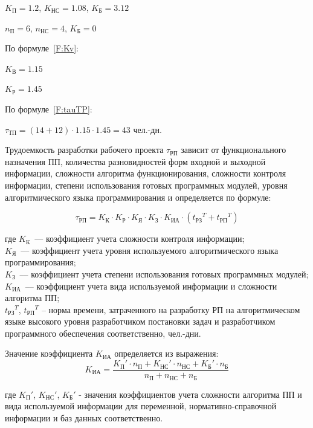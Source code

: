 $K_{\text{П}} = 1.2$, $K_{\text{НС}} = 1.08$, $K_{\text{Б}} = 3.12$

$n_{\text{П}} = 6$, $n_{\text{НС}} = 4$, $K_{\text{Б}} = 0$

По формуле~\ref{F:Kv}:

$K_{\text{В}} = 1.15$

$K_{\text{Р}} = 1.45$

По формуле~\ref{F:tauTP}:

$\tau_{\text{ТП}} = (14 + 12) \cdot 1.15 \cdot 1.45 = 43$ чел.-дн.

Трудоемкость разработки рабочего проекта $\tau_{\text{РП}}$ зависит от функционального назначения ПП, количества разновидностей форм входной и выходной информации, сложности алгоритма функционирования, сложности контроля информации, степени использования готовых программных модулей, уровня алгоритмического языка программирования и определяется по формуле:

\begin{equation}
\tau_{\text{РП}} = K_{\text{К}} \cdot K_{\text{Р}} \cdot K_{\text{Я}} \cdot K_{\text{З}} \cdot K_{\text{ИА}} \cdot ({t_{\text{РЗ}}}^T + {t_{\text{РП}}}^T)
\label{F:tauRP}
\end{equation}

где $K_{\text{К}}$~--– коэффициент учета сложности контроля информации; \\ $K_{\text{Я}}$~--– коэффициент учета уровня используемого алгоритмического языка программирования; \\ $K_{\text{З}}$~--– коэффициент учета степени использования готовых программных модулей; \\ $K_{\text{ИА}}$~--– коэффициент учета вида используемой информации и сложности алгоритма ПП; \\ ${t_{\text{РЗ}}}^T$, ${t_{\text{РП}}}^T$ – норма времени, затраченного на разработку РП на алгоритмическом языке высокого уровня разработчиком постановки задач и разработчиком программного обеспечения соответственно, чел.-дни.

Значение коэффициента $K_{\text{ИА}}$ определяется из выражения:
\begin{equation}
K_{\text{ИА}} = \frac{{K_{\text{П}}}' \cdot n_{\text{П}} + {K_{\text{НС}}}' \cdot n_{\text{НС}} + {K_{\text{Б}}}' \cdot n_{\text{Б}}}{n_{\text{П}} + n_{\text{НС}} + n_{\text{Б}}}
\label{F:KIA}
\end{equation}

где ${K_{\text{П}}}'$, ${K_{\text{НС}}}'$, ${K_{\text{Б}}}'$ - значения коэффициентов учета сложности алгоритма ПП и вида используемой информации для переменной, нормативно-справочной информации и баз данных соответственно.

